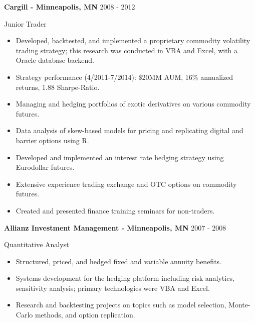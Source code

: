 \documentclass[11pt,a4paper,]{awesome-cv}
\begin{document}
\normalsize

\textbf{Cargill - Minneapolis, MN} \hfill 2008 - 2012

\vspace{-1ex}

Junior Trader

\vspace{-1.5ex}

\small

\begin{itemize}
\item
  Developed, backtested, and implemented a proprietary commodity
  volatility trading strategy; this research was conducted in VBA and
  Excel, with a Oracle database backend. \vspace{-0.5ex}
\item
  Strategy performance (4/2011-7/2014): \$20MM AUM, 16\% annualized
  returns, 1.88 Sharpe-Ratio. \vspace{-0.5ex}
\item
  Managing and hedging portfolios of exotic derivatives on various
  commodity futures. \vspace{-0.5ex}
\item
  Data analysis of skew-based models for pricing and replicating digital
  and barrier options using R. \vspace{-0.5ex}
\item
  Developed and implemented an interest rate hedging strategy using
  Eurodollar futures. \vspace{-0.5ex}
\item
  Extensive experience trading exchange and OTC options on commodity
  futures. \vspace{-0.5ex}
\item
  Created and presented finance training seminars for non-traders.
  \vspace{-0.5ex}
\end{itemize}

\pagebreak

\normalsize

\textbf{Allianz Investment Management - Minneapolis, MN} \hfill 2007 -
2008

\vspace{-1ex}

Quantitative Analyst

\vspace{-1.5ex}

\small

\begin{itemize}
\item
  Structured, priced, and hedged fixed and variable annuity benefits.
  \vspace{-0.5ex}
\item
  Systems development for the hedging platform including risk analytics,
  sensitivity analysis; primary technologies were VBA and Excel.
  \vspace{-0.5ex}
\item
  Research and backtesting projects on topics such as model selection,
  Monte-Carlo methods, and option replication. \vspace{-0.5ex}
\end{itemize}
\end{document}

